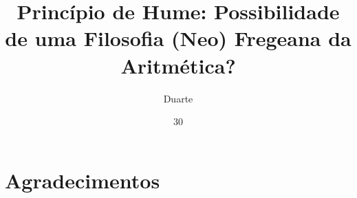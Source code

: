 \documentclass[diss]{UFRuralRJ}
\title{Princípio de Hume: Possibilidade de uma Filosofia (Neo) Fregeana da Aritmética?} %
\author{Duarte}{Alessandro Bandeira} %
\date{30}{Fevereiro}{2016} %
\begin{document}
\maketitle


\makeapprove




\chapter*{Agradecimentos}
\end{document}

